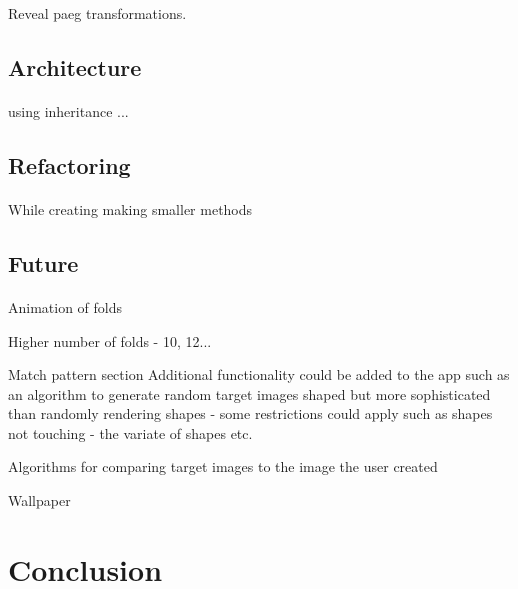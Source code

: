 \documentclass[11pt]{article}
\begin{document}
        
        Reveal paeg transformations. 
        
    \subsection{Architecture}
        
        \paragraph{}
using inheritance ... 
        
    \subsection{Refactoring}
        
        \paragraph{}
        While creating making smaller methods
            
            
    \subsection{Future}
        
                \paragraph{}
                
                Animation of folds
                
                Higher number of folds - 10, 12...
                
                Match pattern section
                Additional functionality could be added to the app such as an algorithm to generate random target images shaped but more sophisticated than randomly rendering shapes - some restrictions could apply such as shapes not touching - the variate of shapes etc.
                
                Algorithms for comparing target images to the image the user created 
                
                
                Wallpaper
                
\newpage
\section{Conclusion}
        
\end{document}
